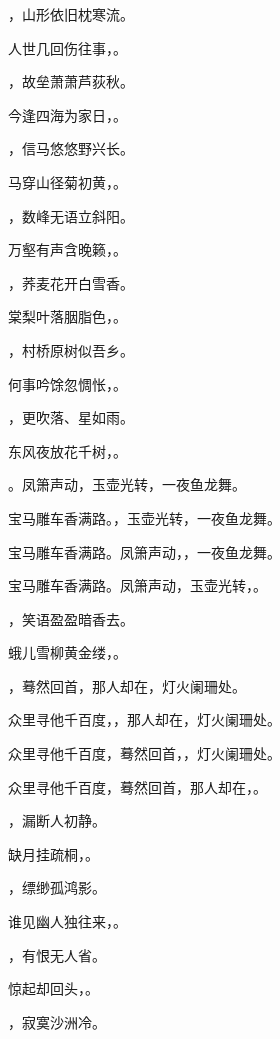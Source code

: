 \documentclass[12pt, a4paper, addpoints, answers]{exam}
\begin{document}
\begin{questions}
\question[3] \fillin ，山形依旧枕寒流。

\question[3] 人世几回伤往事，\fillin 。

\question[3] \fillin ，故垒萧萧芦荻秋。

\question[3] 今逢四海为家日，\fillin 。

\question[3] \fillin ，信马悠悠野兴长。

\question[3] 马穿山径菊初黄，\fillin 。

\question[3] \fillin ，数峰无语立斜阳。

\question[3] 万壑有声含晚籁，\fillin 。

\question[3] \fillin ，荞麦花开白雪香。

\question[3] 棠梨叶落胭脂色，\fillin 。

\question[3] \fillin ，村桥原树似吾乡。

\question[3] 何事吟馀忽惆怅，\fillin 。

\question[3] \fillin ，更吹落、星如雨。

\question[3] 东风夜放花千树，\fillin 。

\question[3] \fillin 。凤箫声动，玉壶光转，一夜鱼龙舞。

\question[3] 宝马雕车香满路。\fillin ，玉壶光转，一夜鱼龙舞。

\question[3] 宝马雕车香满路。凤箫声动，\fillin ，一夜鱼龙舞。

\question[3] 宝马雕车香满路。凤箫声动，玉壶光转，\fillin 。

\question[3] \fillin ，笑语盈盈暗香去。

\question[3] 蛾儿雪柳黄金缕，\fillin 。

\question[3] \fillin ，蓦然回首，那人却在，灯火阑珊处。

\question[3] 众里寻他千百度，\fillin ，那人却在，灯火阑珊处。

\question[3] 众里寻他千百度，蓦然回首，\fillin ，灯火阑珊处。

\question[3] 众里寻他千百度，蓦然回首，那人却在，\fillin 。

\question[3] \fillin ，漏断人初静。

\question[3] 缺月挂疏桐，\fillin 。

\question[3] \fillin ，缥缈孤鸿影。

\question[3] 谁见幽人独往来，\fillin 。

\question[3] \fillin ，有恨无人省。

\question[3] 惊起却回头，\fillin 。

\question[3] \fillin ，寂寞沙洲冷。


\end{questions}
\end{document}
